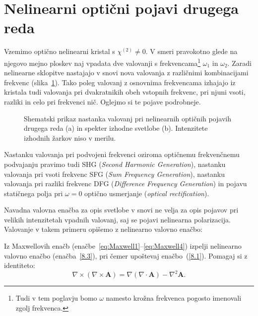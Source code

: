 \section{Nelinearni optični pojavi drugega reda}
Vzemimo optično nelinearni kristal s $\chi^{(2)} \neq 0$. V smeri pravokotno 
glede na njegovo mejno ploskev naj vpadata dve valovanji s frekvencama\footnote{Tudi 
v tem poglavju bomo $\omega$ namesto krožna frekvenca pogosto imenovali zgolj frekvenca.}
$\omega_{1}$ in $\omega_{2}$. Zaradi nelinearne sklopitve nastajajo v snovi nova 
valovanja z različnimi kombinacijami frekvenc (slika~\ref{fig:nl2}).
Tako poleg valovanj z osnovnima frekvencama izhajajo iz kristala tudi 
valovanja pri dvakratnikih obeh vstopnih frekvenc, pri njuni vsoti, 
razliki in celo pri frekvenci nič. Oglejmo si te pojave podrobneje.

\begin{figure}[ht]
\centering
\def\svgwidth{128truemm} 

\caption{Shematski prikaz nastanka valovanj pri nelinearnih optičnih pojavih drugega reda (a)
in spekter izhodne svetlobe (b). Intenzitete izhodnih žarkov niso v merilu.}
\label{fig:nl2}
\end{figure}

\begin{remark}
Nastanku valovanja pri podvojeni frekvenci oziroma optičnemu frekvenčnemu podvajanju pravimo tudi
SHG ({\it Second Harmonic 
Generation}), 
nastanku valovanja pri vsoti frekvenc SFG
({\it Sum Frequency Generation}), 
nastanku valovanja pri razliki frekvenc DFG 
({\it Difference Frequency Generation}) in pojavu 
statičnega polja pri $\omega = 0$ optično usmerjanje
({\it optical rectification}).  
\end{remark}

Navadna valovna enačba za opis svetlobe v snovi  
ne velja za opis pojavov pri velikih 
intenzitetah vpadnih valovanj, saj se pojavi nelinearna polarizacija. Valovanje 
v takem primeru opišemo z nelinearno valovno 
enačbo:

\begin{naloga}
Iz Maxwellovih enačb (enačbe~\ref{eq:Maxwell1}--\ref{eq:Maxwell4}) izpelji 
nelinearno valovno enačbo (enačba~\ref{8.3}), pri čemer upoštevaj enačbo~(\ref{8.1}). 
Pomagaj si z identiteto:
\begin{equation}
\nabla \times (\nabla \times \mathbf{A}) = \nabla (\nabla \cdot \mathbf{A}) 
- \nabla^2 \mathbf{A}.
\end{equation}
\end{naloga} 

